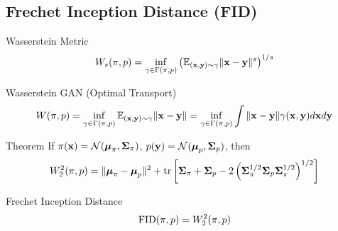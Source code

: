 \documentclass{beamer}
\begin{document}
\subsection{Frechet Inception Distance (FID)}
\begin{frame}{Wasserstein Metric}
	\vspace{-0.2cm}
	\[
		W_s(\pi, p) = \inf_{\gamma \in \Gamma(\pi, p)} \left(\mathbb{E}_{(\mathbf{x}, \mathbf{y}) \sim \gamma} \| \mathbf{x} - \mathbf{y} \|^s\right)^{1/s}
	\]
	\eqpause
	\vspace{-0.3cm}
	\begin{block}{Wasserstein GAN (Optimal Transport)}
		\vspace{-0.5cm}
		\[
			W(\pi, p) = \inf_{\gamma \in \Gamma(\pi, p)} \mathbb{E}_{(\mathbf{x}, \mathbf{y}) \sim \gamma} \| \mathbf{x} - \mathbf{y} \| =  \inf_{\gamma\in {\Gamma(\pi, p)}} \int { \| \mathbf{x}- \mathbf{y}\|} {\gamma (\mathbf{x}, \mathbf{y})} d \mathbf{x} d \mathbf{y}
		\]
		\vspace{-0.5cm}
	\end{block}
	\eqpause
	\begin{block}{Theorem}
		If $\pi(\mathbf{x}) = \mathcal{N}(\boldsymbol{\mu}_\pi, \boldsymbol{\Sigma}_\pi)$, $p(\mathbf{y}) = \mathcal{N}(\boldsymbol{\mu}_p, \boldsymbol{\Sigma}_p)$, then
		\vspace{-0.2cm}
		\[
			W_2^2(\pi, p) = \| \boldsymbol{\mu}_{\pi} - \boldsymbol{\mu}_{p}\|^2 + \text{tr} \left[ \boldsymbol{\Sigma}_{\pi} + \boldsymbol{\Sigma}_p - 2 \left(\boldsymbol{\Sigma}_{\pi}^{1/2} \boldsymbol{\Sigma}_p \boldsymbol{\Sigma}_{\pi}^{1/2} \right)^{1/2} \right]
		\]
		\vspace{-0.7cm}
	\end{block}
	\eqpause
	\begin{block}{Frechet Inception Distance}
		\vspace{-0.3cm}
		\[
			\mathrm{FID} (\pi, p) =  W_2^2(\pi, p)
		\]
		\vspace{-0.6cm}
	\end{block}
\end{frame}
\end{document}

